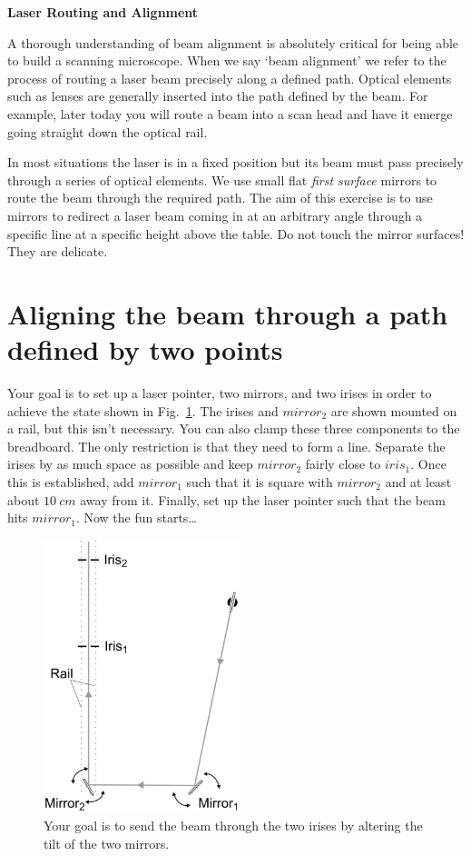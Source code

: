 \documentclass[a4paper]{report}
\begin{document}
\setcounter{secnumdepth}{2}

\begin{center}
\textbf{\Large{Laser Routing and Alignment}}
\end{center}

A thorough understanding of beam alignment is absolutely critical for being able to build a scanning microscope. 
When we say `beam alignment' we refer to the process of routing a laser beam precisely along a defined path. 
Optical elements such as lenses are generally inserted into the path defined by the beam. 
For example, later today you will route a beam into a scan head and have it emerge going straight down the optical rail.

In most situations the laser is in a fixed position but its beam must pass precisely through a series of optical elements. 
We use small flat \textit{first surface} mirrors to route the beam through the required path. 
The aim of this exercise is to use mirrors to redirect a laser beam coming in at an arbitrary angle through a specific line at a specific height above the table.
Do not touch the mirror surfaces! 
They are delicate.


\section{Aligning the beam through a path defined by two points}
Your goal is to set up a laser pointer, two mirrors, and two irises in order to achieve the state shown in Fig.~\ref{fig:ex1}. 
The irises and $mirror_2$ are shown mounted on a rail, but this isn't necessary. 
You can also clamp these three components to the breadboard.
The only restriction is that they need to form a line. 
Separate the irises by as much space as possible and keep $mirror_2$ fairly close to $iris_1$.
Once this is established, add $mirror_1$ such that it is square with $mirror_2$ and at least about $10~cm$ away from it. 
Finally, set up the laser pointer such that the beam hits $mirror_1$.
Now the fun starts\ldots


\begin{figure}[h]
\center
\includegraphics[width=2.25in]{laser_alignment_exercise_basic.eps}
\caption{Your goal is to send the beam through the two irises by altering the tilt of the two mirrors.}
\label{fig:ex1}
\end{figure}
\end{document}
